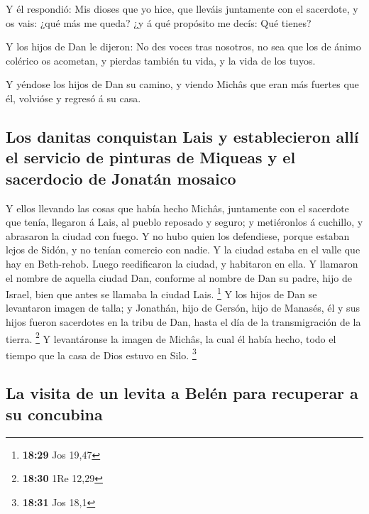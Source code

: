  Y él respondió: Mis dioses que yo hice, que lleváis
juntamente con el sacerdote, y os vais: ¿qué más me queda? ¿y á qué
propósito me decís: Qué tienes?

 Y los hijos de Dan le dijeron: No des voces tras
nosotros, no sea que los de ánimo colérico os acometan, y pierdas
también tu vida, y la vida de los tuyos.

 Y yéndose los hijos de Dan su camino, y viendo Michâs
que eran más fuertes que él, volvióse y regresó á su casa.

\hypertarget{los-danitas-conquistan-lais-y-establecieron-alluxed-el-servicio-de-pinturas-de-miqueas-y-el-sacerdocio-de-jonatuxe1n-mosaico}{%
\subsection{Los danitas conquistan Lais y establecieron allí el servicio
de pinturas de Miqueas y el sacerdocio de Jonatán
mosaico}\label{los-danitas-conquistan-lais-y-establecieron-alluxed-el-servicio-de-pinturas-de-miqueas-y-el-sacerdocio-de-jonatuxe1n-mosaico}}

 Y ellos llevando las cosas que había hecho Michâs,
juntamente con el sacerdote que tenía, llegaron á Lais, al pueblo
reposado y seguro; y metiéronlos á cuchillo, y abrasaron la ciudad con
fuego.  Y no hubo quien los defendiese, porque estaban
lejos de Sidón, y no tenían comercio con nadie. Y la ciudad estaba en el
valle que hay en Beth-rehob. Luego reedificaron la ciudad, y habitaron
en ella.  Y llamaron el nombre de aquella ciudad Dan,
conforme al nombre de Dan su padre, hijo de Israel, bien que antes se
llamaba la ciudad Lais. \footnote{\textbf{18:29} Jos 19,47}
 Y los hijos de Dan se levantaron imagen de talla; y
Jonathán, hijo de Gersón, hijo de Manasés, él y sus hijos fueron
sacerdotes en la tribu de Dan, hasta el día de la transmigración de la
tierra. \footnote{\textbf{18:30} 1Re 12,29}  Y
levantáronse la imagen de Michâs, la cual él había hecho, todo el tiempo
que la casa de Dios estuvo en Silo. \footnote{\textbf{18:31} Jos 18,1}

\hypertarget{la-visita-de-un-levita-a-beluxe9n-para-recuperar-a-su-concubina}{%
\subsection{La visita de un levita a Belén para recuperar a su
concubina}\label{la-visita-de-un-levita-a-beluxe9n-para-recuperar-a-su-concubina}}

